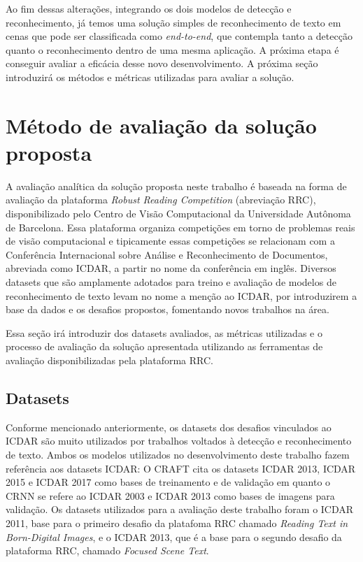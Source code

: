Ao fim dessas alterações, integrando os dois modelos de detecção e reconhecimento, já temos uma solução simples de reconhecimento de texto em cenas que pode ser classificada como \textit{end-to-end}, que contempla tanto a detecção quanto o reconhecimento dentro de uma mesma aplicação. A próxima etapa é conseguir avaliar a eficácia desse novo desenvolvimento. A próxima seção introduzirá os métodos e métricas utilizadas para avaliar a solução.

\section{Método de avaliação da solução proposta}\label{sec:methodology_validation}

A avaliação analítica da solução proposta neste trabalho é baseada na forma de avaliação da plataforma \textit{Robust Reading Competition} (abreviação RRC), disponibilizado pelo Centro de Visão Computacional da Universidade Autônoma de Barcelona. Essa plataforma organiza competições em torno de problemas reais de visão computacional e tipicamente essas competições se relacionam com a Conferência Internacional sobre Análise e Reconhecimento de Documentos, abreviada como ICDAR, a partir no nome da conferência em inglês. Diversos datasets que são amplamente adotados para treino e avaliação de modelos de reconhecimento de texto levam no nome a menção ao ICDAR, por introduzirem a base da dados e os desafios propostos, fomentando novos trabalhos na área.

Essa seção irá introduzir dos datasets avaliados, as métricas utilizadas e o processo de avaliação da solução apresentada utilizando as ferramentas de avaliação disponibilizadas pela plataforma RRC.

\subsection{Datasets}\label{sec:methodology_datasets}

Conforme mencionado anteriormente, os datasets dos desafios vinculados ao ICDAR são muito utilizados por trabalhos voltados à detecção e reconhecimento de texto. Ambos os modelos utilizados no desenvolvimento deste trabalho fazem referência aos datasets ICDAR: O CRAFT cita os datasets ICDAR 2013, ICDAR 2015 e ICDAR 2017 como bases de treinamento e de validação em quanto o CRNN se refere ao ICDAR 2003 e ICDAR 2013 como bases de imagens para validação. Os datasets utilizados para a avaliação deste trabalho foram o ICDAR 2011, base para o primeiro desafio da platafoma RRC chamado \textit{Reading Text in Born-Digital Images}, e o ICDAR 2013, que é a base para o segundo desafio da plataforma RRC, chamado \textit{Focused Scene Text}.

